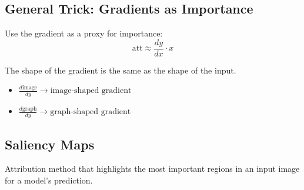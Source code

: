 \subsection{General Trick: Gradients as Importance}
\begin{definition}
    Use the gradient as a proxy for importance:
    \begin{equation*}
        \text{att} \approx \frac{dy}{dx} \cdot x
    \end{equation*}
\end{definition}

\begin{warning}
    The shape of the gradient is the same as the shape of the input.
    \begin{itemize}
        \item $\frac{d\text{image}}{dy} \rightarrow \text{image-shaped gradient}$
    \end{itemize}
    \begin{itemize}
        \item $\frac{d\text{graph}}{dy} \rightarrow \text{graph-shaped gradient}$
    \end{itemize}
\end{warning}

\subsection{Saliency Maps}
\begin{definition}
    Attribution method that highlights the most important regions in an input image for a model's prediction. 
\end{definition}

